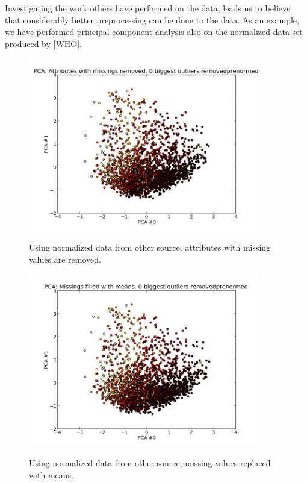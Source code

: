 Investigating the work others have performed on the data, leads us to believe that considerably better preprocessing can be done to the data. As an example, we have performed principal component analysis also on the normalized data set produced by [WHO].

\begin{figure}[H]
\centering
\includegraphics[width=0.9\textwidth]{pca/attr-with-missings-removed_0-biggest-outliers-removed_prenormed_}
\label{fig:prenorm_attrrem_0out}
\caption{Using normalized data from other source, attributes with missing values are removed.}
\end{figure}

\begin{figure}[H]
\centering
\includegraphics[width=0.9\textwidth]{pca/missings-filled-w-means_0-biggest-outliers-removed_prenormed_}
\label{fig:prenorm_attrrem_0out}
\caption{Using normalized data from other source, missing values replaced with means.}
\end{figure}

